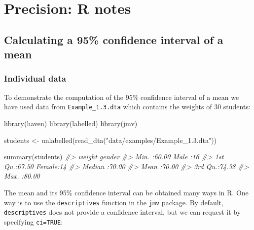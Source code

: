 \documentclass[
]{memoir}
\newenvironment{Shaded}{\begin{snugshade}}{\end{snugshade}}
\newcommand{\CommentTok}[1]{\textcolor[rgb]{0.56,0.35,0.01}{\textit{#1}}}
\newcommand{\FunctionTok}[1]{\textcolor[rgb]{0.00,0.00,0.00}{#1}}
\newcommand{\NormalTok}[1]{#1}
\newcommand{\OtherTok}[1]{\textcolor[rgb]{0.56,0.35,0.01}{#1}}
\newcommand{\StringTok}[1]{\textcolor[rgb]{0.31,0.60,0.02}{#1}}
\begin{document}
\hypertarget{precision-r-notes}{%
\chapter{Precision: R notes}\label{precision-r-notes}}

\hypertarget{calculating-a-95-confidence-interval-of-a-mean}{%
\section{Calculating a 95\% confidence interval of a mean}\label{calculating-a-95-confidence-interval-of-a-mean}}

\hypertarget{individual-data}{%
\subsection{Individual data}\label{individual-data}}

To demonstrate the computation of the 95\% confidence interval of a mean we have used data from \texttt{Example\_1.3.dta} which contains the weights of 30 students:

\begin{Shaded}
\begin{Highlighting}[]
\FunctionTok{library}\NormalTok{(haven)}
\FunctionTok{library}\NormalTok{(labelled)}
\FunctionTok{library}\NormalTok{(jmv)}

\NormalTok{students }\OtherTok{\textless{}{-}} \FunctionTok{unlabelled}\NormalTok{(}\FunctionTok{read\_dta}\NormalTok{(}\StringTok{"data/examples/Example\_1.3.dta"}\NormalTok{))}

\FunctionTok{summary}\NormalTok{(students)}
\CommentTok{\#\textgreater{}      weight         gender  }
\CommentTok{\#\textgreater{}  Min.   :60.00   Male  :16  }
\CommentTok{\#\textgreater{}  1st Qu.:67.50   Female:14  }
\CommentTok{\#\textgreater{}  Median :70.00              }
\CommentTok{\#\textgreater{}  Mean   :70.00              }
\CommentTok{\#\textgreater{}  3rd Qu.:74.38              }
\CommentTok{\#\textgreater{}  Max.   :80.00}
\end{Highlighting}
\end{Shaded}

The mean and its 95\% confidence interval can be obtained many ways in R. One way is to use the \texttt{descriptives} function in the \texttt{jmv} package. By default, \texttt{descriptives} does not provide a confidence interval, but we can request it by specifying \texttt{ci=TRUE}:
\end{document}

